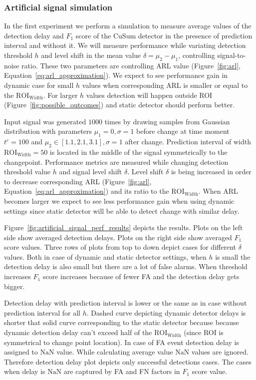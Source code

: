 \subsubsection{Artificial signal simulation}
In the first experiment we perform a simulation to measure average values of the detection delay and $F_1$ score of the CuSum detector in the presence of prediction interval and without it. We will measure performance while variating detection threshold $h$ and level shift in the mean value $\delta=\mu_2-\mu_1$, controlling signal-to-noise ratio. These two parameters are controlling ARL value (Figure~\ref{fig:arl}, Equation~\ref{eq:arl_approximation}).
We expect to see performance gain in dynamic case for small $h$ values when corresponding ARL is smaller or equal to the $\text{ROI}_{\text{Width}}$. For larger $h$ values detection will happen outside ROI (Figure~\ref{fig:possible_outcomes}) and static detector should perform better. 

Input signal was generated $1000$ times by drawing samples from Gaussian distribution with parameters $\mu_1=0, \sigma=1$ before change at time moment $t^c = 100$ and $\mu_2 \in [1.1, 2.1, 3.1], \sigma=1$ after change.
Prediction interval of width $\text{ROI}_{\text{Width}}=50$ is located in the middle of the signal symmetrically to the changepoint.
Performance metrics are measured while changing detection threshold value $h$ and signal level shift $\delta$.
Level shift $\delta$ is being increased in order to decrease corresponding ARL (Figure~\ref{fig:arl}, Equation~\ref{eq:arl_approximation}) and its ratio to the $\text{ROI}_{\text{Width}}$.
When ARL becomes larger we expect to see less performance gain when using dynamic settings since static detector will be able to detect change with similar delay.

Figure~\ref{fig:artificial_signal_perf_results} depicts the results.
Plots on the left side show averaged detection delays.
Plots on the right side show averaged $F_1$ score values.
Three rows of plots from top to down depict cases for different $\delta$ values.
Both in case of dynamic and static detector settings, when $h$ is small the detection delay is also small but there are a lot of false alarms. 
When threshold increases $F_1$ score increases because of fewer FA and the detection delay gets bigger. 

Detection delay with prediction interval is lower or the same as in case without prediction interval for all $h$.
Dashed curve depicting dynamic detector delays is shorter that solid curve corresponding to the static detector because because dynamic detection delay can't exceed half of the $\text{ROI}_{\text{Width}}$ (since ROI is symmetrical to change point location). 
In case of FA event detection delay is assigned to $\text{NaN}$ value. 
While calculating average value $\text{NaN}$ values are ignored. 
Therefore detection delay plot depicts only successful detections cases. 
The cases when delay is $\text{NaN}$ are captured by FA and FN factors in $F_1$ score value.

